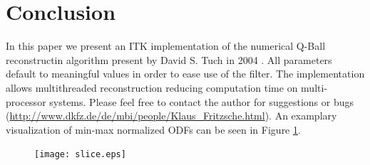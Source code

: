 \documentclass{InsightArticle}
\begin{document}
\section{Conclusion}
In this paper we present an ITK implementation of the numerical Q-Ball reconstructin algorithm present by David S. Tuch in 2004 \cite{Tuch2004}. All parameters default to meaningful values in order to ease use of the filter. The implementation allows multithreaded reconstruction reducing computation time on multi-processor systems. Please feel free to contact the author for suggestions or bugs
(\url{http://www.dkfz.de/de/mbi/people/Klaus_Fritzsche.html}). An examplary visualization of min-max normalized ODFs can be seen in Figure \ref{fig:slice}.
\begin{figure}
\center
\texttt{[image: slice.eps]}
\label{fig:slice}
\end{figure}

%
%



\end{document}
